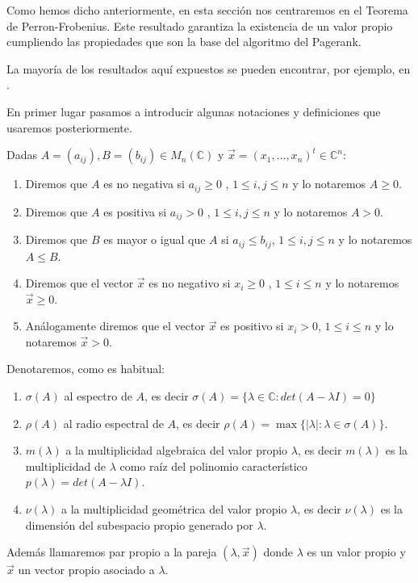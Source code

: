 \documentclass[size=a4, parskip=half, titlepage=false, toc=flat, toc=bib, 12pt, twoside]{scrartcl}
\theoremstyle{theorem-style}
\theoremstyle{definition-style}
\theoremstyle{remark-style}
\theoremstyle{example-style}
\theoremstyle{definition-style}
\theoremstyle{remark-style}
\begin{document}
Como hemos dicho anteriormente, en esta sección nos centraremos en el Teorema de Perron-Frobenius. Este resultado garantiza la existencia de un valor propio cumpliendo las propiedades que son la base del algoritmo del Pagerank.

La mayoría de los resultados aquí expuestos se pueden encontrar, por ejemplo, en \cite{algebralineal}.

En primer lugar pasamos a introducir algunas notaciones y definiciones que usaremos posteriormente.

Dadas $A = (a_{ij}),B = (b_{ij}) \in M_n(\mathbb{C})$ y $\vec{x} = (x_1, \dots, x_n)^t\in \mathbb{C}^n$:
\begin{enumerate}
\item Diremos que $A$ es no negativa si $a_{ij}\geq 0$ , $1 \leq i,j \leq n$ y lo notaremos
$A\geq 0$.
\item Diremos que $A$ es positiva si $a_{ij} > 0$ , $1 \leq i, j \leq n$ y lo notaremos $A > 0$.
\item Diremos que $B$ es mayor o igual que $A$ si $a_{ij} \leq b_{ij}$, $1 \leq i,j \leq n$ y lo notaremos $A \leq B$.
\item Diremos que el vector $\vec{x}$ es no negativo si $x_i \geq 0$ , $1 \leq i \leq n$ y lo notaremos $\vec{x} \geq 0$.
\item Análogamente diremos que el vector $\vec{x}$ es positivo si $x_i > 0$, $1 \leq i \leq n$ y lo notaremos $\vec{x} > 0$.
\end{enumerate}

Denotaremos, como es habitual:
\begin{enumerate}
\item $\sigma (A)$ al espectro de $A$, es decir $\sigma(A) = \{ \lambda \in \mathbb{C} : det(A - \lambda I)= 0\}$
\item $\rho(A)$ al radio espectral de $A$, es decir $\rho(A) = \max\{|\lambda| : \lambda \in \sigma(A) \}$.
\item $m(\lambda)$ a la multiplicidad algebraica del valor propio $\lambda$, es decir $m(\lambda)$ es la multiplicidad de $\lambda$ como raíz del polinomio característico $p(\lambda) = det(A - \lambda I)$.
\item $\nu(\lambda)$ a la multiplicidad geométrica del valor propio $\lambda$, es decir $\nu(\lambda)$ es la dimensión del subespacio propio generado por $\lambda$.
\end{enumerate}

Además llamaremos par propio a la pareja $(\lambda, \vec{x})$ donde $\lambda$ es un valor propio y $\vec{x}$ un vector propio asociado a $\lambda$.
\end{document}
